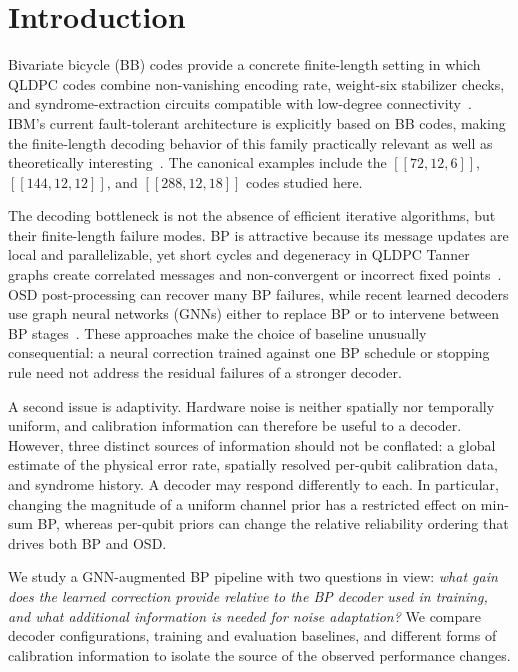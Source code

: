 \documentclass[a4paper,twocolumn,11pt,nopdfoutputerror]{quantumarticle}
\newcommand{\code}[3]{\ensuremath{[\![#1,#2,#3]\!]}}
\begin{document}
\section{Introduction}

Bivariate bicycle (BB) codes provide a concrete finite-length setting in
which QLDPC codes combine non-vanishing encoding rate, weight-six
stabilizer checks, and syndrome-extraction circuits compatible with
low-degree connectivity~\cite{Bravyi2024Memory}. IBM's current
fault-tolerant architecture is explicitly based on BB codes, making the
finite-length decoding behavior of this family practically relevant as
well as theoretically interesting~\cite{IBMRoadmap2025}. The canonical
examples include the $\code{72}{12}{6}$, $\code{144}{12}{12}$, and
$\code{288}{12}{18}$ codes studied here.

The decoding bottleneck is not the absence of efficient iterative
algorithms, but their finite-length failure modes. BP is attractive
because its message updates are local and parallelizable, yet short
cycles and degeneracy in QLDPC Tanner graphs create correlated messages
and non-convergent or incorrect fixed points~\cite{Roffe2020Landscape}.
OSD post-processing can recover many BP failures, while recent learned
decoders use graph neural networks (GNNs) either to replace BP or to
intervene between BP stages~\cite{Gong2024GNN,Maan2025MLBP}. These
approaches make the choice of baseline unusually consequential: a neural
correction trained against one BP schedule or stopping rule need not
address the residual failures of a stronger decoder.

A second issue is adaptivity. Hardware noise is neither spatially nor
temporally uniform, and calibration information can therefore be useful
to a decoder. However, three distinct sources of information should not
be conflated: a global estimate of the physical error rate, spatially
resolved per-qubit calibration data, and syndrome history. A decoder may
respond differently to each. In particular, changing the magnitude of a
uniform channel prior has a restricted effect on min-sum BP, whereas
per-qubit priors can change the relative reliability ordering that drives
both BP and OSD.

We study a GNN-augmented BP pipeline with two questions in view:
\emph{what gain does the learned correction provide relative to the BP
decoder used in training, and what additional information is needed for
noise adaptation?} We compare decoder configurations, training and
evaluation baselines, and different forms of calibration information to
isolate the source of the observed performance changes.
\end{document}
